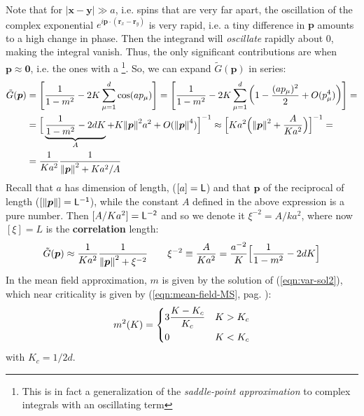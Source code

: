 \documentclass[../../main.tex]{subfiles}
\begin{document}
\medskip

Note that for $|\bm{x}-\bm{y}| \gg a$, i.e. spins that are very far apart, the oscillation of the complex exponential $e^{i \bm{p} \cdot (\bm{r}_x - \bm{r}_y)}$ is very rapid, i.e. a tiny difference in $\bm{p}$ amounts to a high change in phase. Then the integrand will \textit{oscillate} rapidly about $0$, making the integral vanish. Thus, the only significant contributions are when $\bm{p} \approx \bm{0}$, i.e. the ones with a \footnote{This is in fact a generalization of the \textit{saddle-point approximation} to complex integrals with an oscillating term}. So, we can expand $\tilde{G}(\bm{p})$ in series:
\begin{align*}
    \tilde{G}(\bm{p}) &= \left[\frac{1}{1-m^2} - 2K \sum_{\mu=1}^d \cos(a p_\mu)\right] = \left[\frac{1}{1-m^2} - 2K \sum_{\mu=1}^d \left(1 - \frac{(a p_\mu)^2}{2} + O(p_\mu^4) \right) \right] =\\
    &= \Big[\underbrace{\frac{1}{1-m^2} - 2 dK}_{A} + K \norm{\bm{p}}^2 a^2 + O(\norm{\bm{p}}^4) \Big]^{-1} \approx \Big[Ka^2\Big(\norm{\bm{p}}^2 + \frac{A}{Ka^2} \Big) \Big]^{-1} =\\
    &= \frac{1}{Ka^2} \frac{1}{\norm{\bm{p}}^2 + Ka^2/A}   
\end{align*}
Recall that $a$ has dimension of length, ($[a] = \sf{L}$) and that $\bm{p}$ of the reciprocal of length ($[\norm{\bm{p}}] = \sf{L}^{-1}$), while the constant $A$ defined in the above expression is a pure number. Then $[A/Ka^2] = \sf{L}^{-2}$ and so we denote it $\xi^{-2} = A/ka^2$, where now $[\xi] = \si{L}$ is the \textbf{correlation} length:
\begin{align}\label{eqn:G-corr}
    \tilde{G}(\bm{p}) \approx \frac{1}{Ka^2} \frac{1}{\norm{\bm{p}}^2 + \xi^{-2}} \qquad \xi^{-2} \equiv \frac{A}{Ka^2} = \frac{a^{-2}}{K} \Big[\frac{1}{1-m^2} - 2dK \Big]    
\end{align}
In the mean field approximation, $m$ is given by the solution of (\ref{eqn:var-sol2}), which near criticality is given by (\ref{eqn:mean-field-MS}, pag. \pageref{eqn:mean-field-MS}):
\begin{align*}
    m^2(K) = \begin{dcases}
        3 \frac{K-K_c}{K_c} & K > K_c\\
        0 & K < K_c 
    \end{dcases}
\end{align*}
with $K_c = 1/2d$. 
\end{document}
